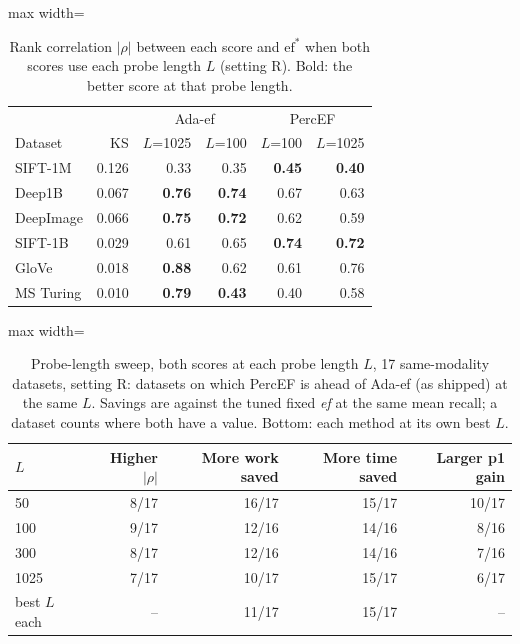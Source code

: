\documentclass[10pt,journal,compsoc]{IEEEtran}
\newcommand{\ef}{\textit{ef}}
\begin{document}
\begin{table}[t]
  \caption{Rank correlation $|\rho|$ between each score and $\mathrm{ef}^*$ when both scores use
  each probe length $L$ (setting R). Bold: the better score at that probe length.}
  \label{tab:ablation}
  \centering\footnotesize
  \begin{adjustbox}{max width=\linewidth}\begin{tabular}{lrrrrr}
    \toprule
    & & \multicolumn{2}{c}{Ada-ef} & \multicolumn{2}{c}{PercEF} \\
    Dataset & KS & $L$=1025 & $L$=100 & $L$=100 & $L$=1025 \\
    \midrule
    SIFT-1M   & 0.126 & 0.33 & 0.35 & \textbf{0.45} & \textbf{0.40} \\
    Deep1B    & 0.067 & \textbf{0.76} & \textbf{0.74} & 0.67 & 0.63 \\
    DeepImage & 0.066 & \textbf{0.75} & \textbf{0.72} & 0.62 & 0.59 \\
    SIFT-1B   & 0.029 & 0.61 & 0.65 & \textbf{0.74} & \textbf{0.72} \\
    GloVe     & 0.018 & \textbf{0.88} & 0.62 & 0.61 & 0.76 \\
    MS Turing & 0.010 & \textbf{0.79} & \textbf{0.43} & 0.40 & 0.58 \\
    \bottomrule
  \end{tabular}\end{adjustbox}
\end{table}

\begin{table}[t]
  \caption{Probe-length sweep, both scores at each probe length $L$, 17 same-modality datasets,
  setting R: datasets on which PercEF is ahead of Ada-ef (as shipped) at the same $L$. Savings are
  against the tuned fixed \ef{} at the same mean recall; a dataset counts where both have a value.
  Bottom: each method at its own best $L$.}
  \label{tab:probes}
  \centering\footnotesize\setlength{\tabcolsep}{3.5pt}
  \begin{adjustbox}{max width=\linewidth}\begin{tabular}{lrrrr}
    \toprule
    $L$ & Higher $|\rho|$ & More work saved & More time saved & Larger p1 gain \\
    \midrule
    50   &  8/17 & 16/17 & 15/17 & 10/17 \\
    100  &  9/17 & 12/16 & 14/16 &  8/16 \\
    300  &  8/17 & 12/16 & 14/16 &  7/16 \\
    1025 &  7/17 & 10/17 & 15/17 &  6/17 \\
    \midrule
    best $L$ each & -- & 11/17 & 15/17 & -- \\
    \bottomrule
  \end{tabular}\end{adjustbox}
\end{table}
\end{document}
